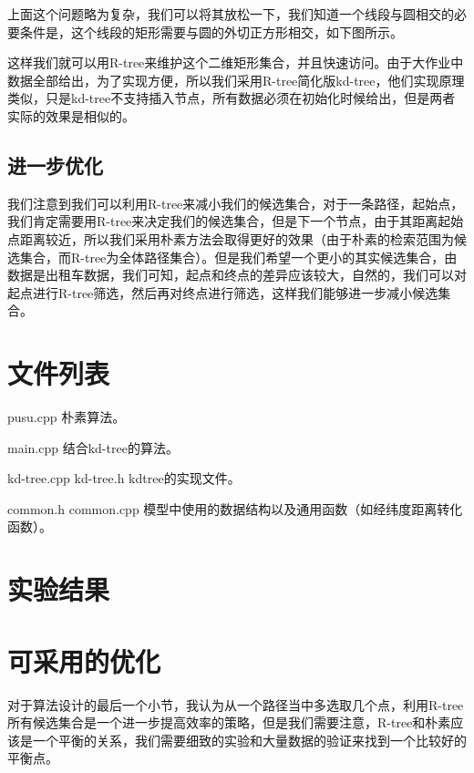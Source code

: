 \documentclass{article}
\begin{document}
上面这个问题略为复杂，我们可以将其放松一下，我们知道一个线段与圆相交的必要条件是，这个线段的矩形需要与圆的外切正方形相交，如下图所示。\par

这样我们就可以用R-tree来维护这个二维矩形集合，并且快速访问。由于大作业中数据全部给出，为了实现方便，所以我们采用R-tree简化版kd-tree，他们实现原理类似，只是kd-tree不支持插入节点，所有数据必须在初始化时候给出，但是两者实际的效果是相似的。\par

\subsection{进一步优化}

我们注意到我们可以利用R-tree来减小我们的候选集合，对于一条路径，起始点，我们肯定需要用R-tree来决定我们的候选集合，但是下一个节点，由于其距离起始点距离较近，所以我们采用朴素方法会取得更好的效果（由于朴素的检索范围为候选集合，而R-tree为全体路径集合）。但是我们希望一个更小的其实候选集合，由数据是出租车数据，我们可知，起点和终点的差异应该较大，自然的，我们可以对起点进行R-tree筛选，然后再对终点进行筛选，这样我们能够进一步减小候选集合。

\section{文件列表}

pusu.cpp 朴素算法。\par

main.cpp 结合kd-tree的算法。\par

kd-tree.cpp kd-tree.h kdtree的实现文件。\par

common.h common.cpp 模型中使用的数据结构以及通用函数（如经纬度距离转化函数）。\par

\section{实验结果}

\section{可采用的优化}

对于算法设计的最后一个小节，我认为从一个路径当中多选取几个点，利用R-tree所有候选集合是一个进一步提高效率的策略，但是我们需要注意，R-tree和朴素应该是一个平衡的关系，我们需要细致的实验和大量数据的验证来找到一个比较好的平衡点。
\end{document}
